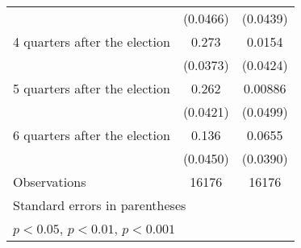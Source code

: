 \begin{table}[htbp]
\begin{tabular}{l*{2}{c}}
                    &    (0.0466)         &    (0.0439)         \\
[1em]
 4 quarters after the election&       0.273\sym{***}&      0.0154         \\
                    &    (0.0373)         &    (0.0424)         \\
[1em]
 5 quarters after the election&       0.262\sym{***}&     0.00886         \\
                    &    (0.0421)         &    (0.0499)         \\
[1em]
 6 quarters after the election&       0.136\sym{**} &      0.0655         \\
                    &    (0.0450)         &    (0.0390)         \\
\hline
Observations        &       16176         &       16176         \\
\hline\hline
\multicolumn{3}{l}{\footnotesize Standard errors in parentheses}\\
\multicolumn{3}{l}{\footnotesize \sym{*} \(p<0.05\), \sym{**} \(p<0.01\), \sym{***} \(p<0.001\)}\\
\end{tabular}
\end{table}
